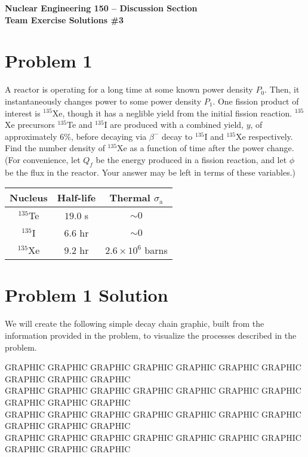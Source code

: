 \documentclass{report}
\begin{document}
\begin{center}
\textbf{\large Nuclear Engineering 150 -- Discussion Section}\\ 
\textbf{Team Exercise Solutions \#3}
\end{center}

\section*{Problem 1}

A reactor is operating for a long time at some known power density $P_0$. Then, it instantaneously changes power to some power density $P_1$. One fission product of interest is $^{135}$Xe, though it has a neglible yield from the initial fission reaction. $^{135}$Xe precursors $^{135}$Te and $^{135}$I are produced with a combined yield, $y$, of approximately 6\%, before decaying via $\beta^{-}$ decay to $^{135}$I and $^{135}$Xe respectively. Find the number density of $^{135}$Xe as a function of time after the power change. (For convenience, let $Q_f$ be the energy produced in a fission reaction, and let $\phi$ be the flux in the reactor. Your answer may be left in terms of these variables.)

\begin{table}[htbp]
	\centering
	\begin{tabular}{|c|c|c|}
			\hline
			Nucleus		&	Half-life 	& Thermal $\sigma_{\text{a}}$ \\
			\hline
			$^{135}$Te	&  $19.0$ s 	& $\sim 0$\\
			$^{135}$I	&  $6.6$ hr 	& $\sim 0$\\
			$^{135}$Xe	&  $9.2$ hr 	& $2.6 \times 10^6$ barns \\
			\hline
	\end{tabular}
	\label{tab:design-specs}
\end{table}



\section*{Problem 1 Solution}

We will create the following simple decay chain graphic, built from the information provided in the problem, to visualize the processes described in the problem.

GRAPHIC GRAPHIC GRAPHIC GRAPHIC GRAPHIC GRAPHIC GRAPHIC GRAPHIC GRAPHIC GRAPHIC \\
GRAPHIC GRAPHIC GRAPHIC GRAPHIC GRAPHIC GRAPHIC GRAPHIC GRAPHIC GRAPHIC GRAPHIC \\
GRAPHIC GRAPHIC GRAPHIC GRAPHIC GRAPHIC GRAPHIC GRAPHIC GRAPHIC GRAPHIC GRAPHIC \\
GRAPHIC GRAPHIC GRAPHIC GRAPHIC GRAPHIC GRAPHIC GRAPHIC GRAPHIC GRAPHIC GRAPHIC \\
\end{document}
